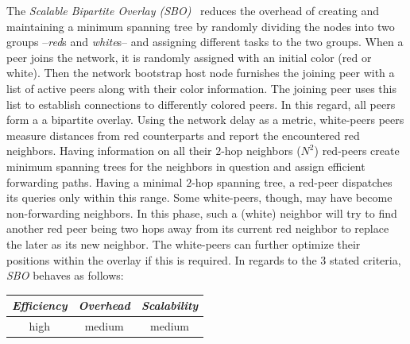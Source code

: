 The \emph{Scalable Bipartite Overlay (SBO)}~\cite{LXN2004,LXN2007} 
reduces the overhead of creating
and maintaining a minimum spanning tree 
by randomly dividing the nodes into
two groups --\emph{red}s and \emph{white}s-- 
and assigning different tasks to the two groups.
When a peer joins the network, it is randomly assigned with an initial
color (red or white).
Then the network bootstrap host node furnishes the joining peer with a list
of active peers along with their color information. 
The joining peer uses this list to 
establish connections to differently colored peers. 
In this regard, all peers form a a bipartite overlay. 
Using the network delay as a metric, white-peers 
peers measure distances from red counterparts
and report the encountered red neighbors.
Having information on all their $2$-hop neighbors 
($N^2$) %
red-peers create minimum spanning trees for the neighbors in question and
assign efficient forwarding paths. 
Having a minimal $2$-hop spanning tree, 
a red-peer dispatches its queries only within this range. 
Some white-peers, though, may have become non-forwarding neighbors. 
In this phase, such a (white) neighbor will try to find another 
red peer being two hops away from its
current red neighbor to replace the later as its new neighbor. 
The white-peers can further optimize their positions within 
the overlay if this is required. 
%
%
%
In regards to the $3$ stated criteria, \emph{SBO} behaves as follows:
\begin{center}
{\footnotesize
\begin{tabular}{ccc}
\emph{Efficiency} & \emph{Overhead} & \emph{Scalability} \\
\hline
high &
medium &
%
medium
\end{tabular}
}
\end{center}

